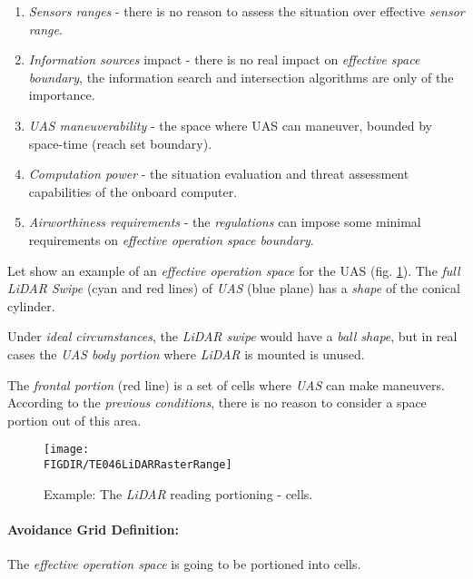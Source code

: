 \begin{enumerate}
        \item \emph{Sensors ranges} -  there is no reason to assess the situation over effective \emph{sensor range}.
        
        \item \emph{Information sources} impact - there is no real impact on \emph{effective space boundary}, the information search and intersection algorithms are only of the importance.
        
        \item \emph{UAS maneuverability} - the space where UAS can maneuver, bounded by space-time (reach set boundary). 
        
        \item \emph{Computation power} - the situation evaluation and threat assessment capabilities of the onboard computer.
        
        \item \emph{Airworthiness requirements} - the \emph{regulations} can impose some minimal requirements on \emph{effective operation space boundary}.
\end{enumerate}

Let show an example of an \emph{effective operation space} for the UAS  (fig. \ref{fig:LidarSpaceSegmentation}).  The \emph{full LiDAR Swipe} (cyan and red lines) of \emph{UAS} (blue plane) has a \emph{shape} of the conical cylinder. 

\begin{note}
Under \emph{ideal circumstances}, the \emph{LiDAR swipe} would have a \emph{ball shape}, but in real cases the \emph{UAS body portion} where \emph{LiDAR} is mounted is unused.
\end{note}

The \emph{frontal portion} (red line) is a set of cells where \emph{UAS} can make maneuvers. According to the \emph{previous conditions}, there is no reason to consider a  space portion out of this area. 

\begin{figure}[H]
    \centering
    \texttt{[image: \\FIGDIR/TE046LiDARRasterRange]} 
    \caption{Example: The \emph{LiDAR} reading portioning - cells.}
    \label{fig:LidarSpaceSegmentation}
\end{figure}

\newpage
\paragraph{Avoidance Grid Definition:} The \emph{effective operation space} is going to be portioned into cells. 


